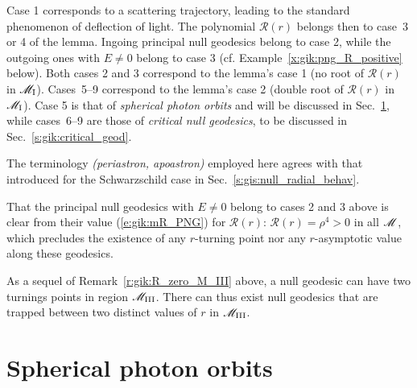 Case 1 corresponds to a scattering trajectory, leading to the standard phenomenon of deflection of light. The polynomial $\mathcal{R}(r)$
belongs then to case~3 or 4 of the lemma.
Ingoing principal null geodesics belong to case 2, while the outgoing ones with $E\neq 0$ belong to case 3
(cf. Example~\ref{x:gik:png_R_positive} below).
Both cases 2 and 3 correspond to the lemma's case 1 (no root of $\mathcal{R}(r)$ in $\mathscr{M}_{\rm I}$).
Cases~5--9 correspond to the lemma's case 2 (double root of $\mathcal{R}(r)$ in $\mathscr{M}_{\rm I}$).
Case 5 is that of \emph{spherical photon orbits} and will be discussed in Sec.~\ref{s:gik:spherical_orbits}, while cases~6--9 are those of \emph{critical null geodesics},
to be discussed in Sec.~\ref{s:gik:critical_geod}.

\begin{remark}
The terminology  \emph{(periastron, apoastron)} employed here agrees with that
introduced for the Schwarzschild case in Sec.~\ref{s:gis:null_radial_behav}.
\end{remark}

\begin{example} \label{x:gik:png_R_positive}
That the principal null geodesics with $E\neq 0$ belong to cases 2 and 3 above
is clear from their value (\ref{e:gik:mR_PNG}) for $\mathcal{R}(r)$:
$\mathcal{R}(r) = \rho^4 > 0$ in all $\mathscr{M}$, which precludes the existence
of any $r$-turning point nor any $r$-asymptotic value along these geodesics.
\end{example}

\begin{remark}
As a sequel of Remark~\ref{r:gik:R_zero_M_III} above, a null geodesic can have
two turnings points in region $\mathscr{M}_{\rm III}$. There can thus exist null geodesics that are trapped
between two distinct values of $r$ in $\mathscr{M}_{\rm III}$.
\end{remark}




\section{Spherical photon orbits} \label{s:gik:spherical_orbits}

